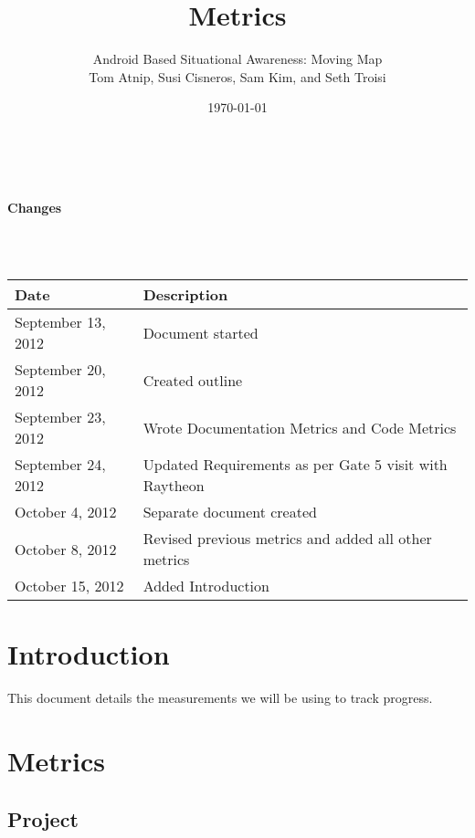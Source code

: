 \documentclass{article}
\begin{document}
\setlength{\voffset}{3.5in}
\title{Metrics}
\author{\Large Android Based Situational Awareness: Moving Map\\
Tom Atnip, Susi Cisneros, Sam Kim, and Seth Troisi}
\date{\today}
\maketitle
\clearpage
\setlength{\voffset}{0pt}
\tableofcontents
\clearpage
~\\
\begin{Large}\textbf{Changes}\end{Large}\\
~\\
\begin{tabular}{ | p{1.5in} | p{4.5in} | }
\hline
\textbf{Date} & \textbf{Description}\\
\hline
\hline
September 13, 2012 & Document started\\
\hline
September 20, 2012 & Created outline\\
\hline
September 23, 2012 & Wrote Documentation Metrics and Code Metrics\\
\hline
September 24, 2012 & Updated Requirements as per Gate 5 visit with Raytheon\\
\hline
October 4, 2012 & Separate document created\\
\hline
October 8, 2012 & Revised previous metrics and added all other metrics\\
\hline
October 15, 2012 & Added Introduction\\
\hline
\end{tabular}
\clearpage

\section{Introduction}
This document details the measurements we will be using to track progress.

\section{Metrics}
\subsection{Project}
\end{document}
